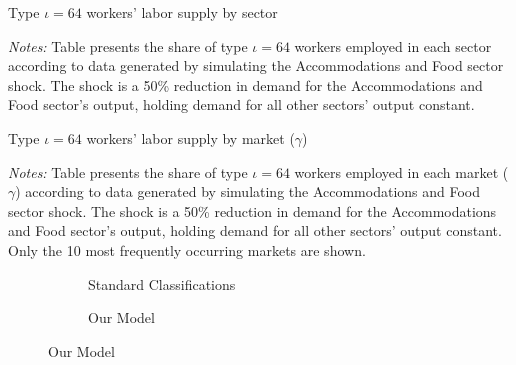 \documentclass[12pt]{article}
\def\g{\gamma}
\def\i{\iota}
\theoremstyle{definition}
\theoremstyle{plain}
\begin{document}
\begin{table}[h!]
	\centering
	\caption{Type $\i=64$ workers' labor supply by sector}
	
	\label{table:shock_case_study_AccomFood_sector_share_table_3}
	\footnotesize \flushleft \emph{Notes:} Table presents the share of type $\i=64$ workers employed in each sector according to data generated by simulating the Accommodations and Food sector shock. The shock is a 50\% reduction in demand for the Accommodations and Food sector's output, holding demand for all other sectors' output constant.
\end{table}

\begin{table}[h!]
	\centering
	\caption{Type $\i=64$ workers' labor supply by market ($\g$)}
	
	\label{table:shock_case_study_AccomFood_gamma_share_table_3}
	\footnotesize \flushleft \emph{Notes:} Table presents the share of type $\i=64$ workers employed in each market ($\g$) according to data generated by simulating the Accommodations and Food sector shock. The shock is a 50\% reduction in demand for the Accommodations and Food sector's output, holding demand for all other sectors' output constant. Only the 10 most frequently occurring markets are shown. 
\end{table}





\begin{figure}[!htbp]
	\centering
	\caption{}
	\begin{subfigure}[t]{0.49\textwidth}
		\centering
		\caption{Standard Classifications}
		\resizebox{3.5cm}{\height}{}
	\end{subfigure}
	\begin{subfigure}[t]{0.49\textwidth}
		\centering
		\caption{Our Model}
		\resizebox{3.5cm}{\height}{}
	\end{subfigure}
	\label{fig:us_vs_ADH_tikz}
\end{figure}



%
%
\end{document}
